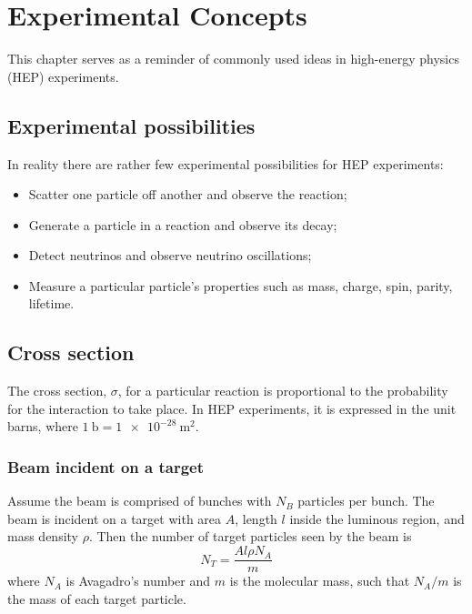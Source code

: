\chapter{Experimental Concepts}
This chapter serves as a reminder of commonly used ideas in high-energy physics (HEP) experiments.

\section{Experimental possibilities}
In reality there are rather few experimental possibilities for HEP experiments:
\begin{itemize}
\item Scatter one particle off another and observe the reaction;
\item Generate a particle in a reaction and observe its decay;
\item Detect neutrinos and observe neutrino oscillations;
\item Measure a particular particle's properties such as mass, charge, spin, parity, lifetime.
\end{itemize}

\section{Cross section}
The cross section, $\sigma$, for a particular reaction is proportional to the probability for the interaction to take place. In HEP experiments, it is expressed in the unit barns, where $\SI{1}{\barn} = \SI{1e-28}{\meter^2}$.

\subsection{Beam incident on a target}
Assume the beam is comprised of bunches with $N_B$ particles per bunch. The beam is incident on a target with area $A$, length $l$ inside the luminous region, and mass density $\rho$. Then the number of target particles seen by the beam is
\begin{equation}
N_T = \frac{Al\rho N_A}{m}
\end{equation}
where $N_A$ is Avagadro's number and $m$ is the molecular mass, such that $N_A/m$ is the mass of each target particle.

